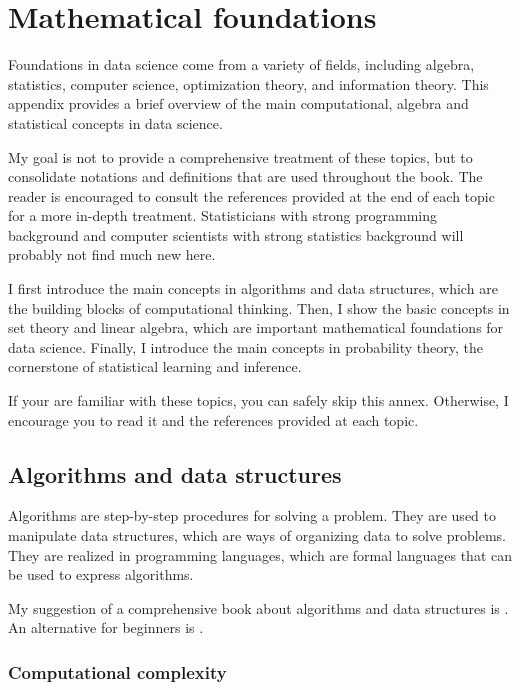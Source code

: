 \chapter{Mathematical foundations}
\label{chap:preliminaries}

Foundations in data science come from a variety of fields, including
algebra, statistics, computer science, optimization theory, and information theory.
This appendix provides a brief overview of the main computational, algebra and statistical
concepts in data science.

My goal is not to provide a comprehensive treatment of these topics, but to consolidate
notations and definitions that are used throughout the book.  The reader is encouraged to
consult the references provided at the end of each topic for a more in-depth treatment.
Statisticians with strong programming background and computer scientists with strong
statistics background will probably not find much new here.

I first introduce the main concepts in algorithms and data structures, which are the
building blocks of computational thinking.  Then, I show the basic concepts in set
theory and linear algebra, which are important mathematical foundations for data science.
Finally, I introduce the main concepts in probability theory, the cornerstone of
statistical learning and inference.

If your are familiar with these topics, you can safely skip this annex.  Otherwise, I
encourage you to read it and the references provided at each topic.

\section{Algorithms and data structures}

Algorithms are step-by-step procedures for solving a problem.  They are used to
manipulate data structures, which are ways of organizing data to solve problems.
They are realized in programming languages, which are formal languages that can be used
to express algorithms.

My suggestion of a comprehensive book about algorithms and data structures is
\textcite{Cormen2022}.  An alternative for beginners is
\textcite{Guttag2021}.

\subsection{Computational complexity}

